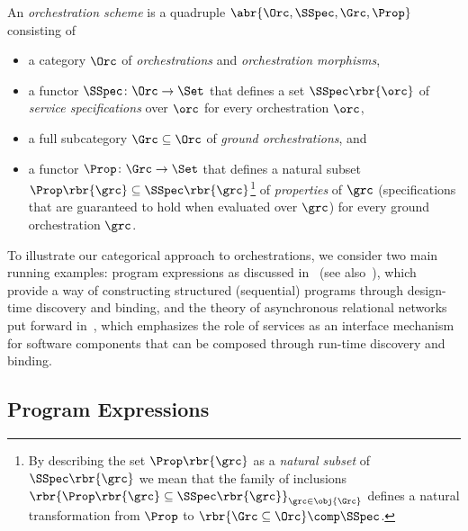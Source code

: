 \documentclass{LMCS}
\begin{document}
\begin{defi}
  An \emph{orchestration scheme} is a quadruple \(\abr{\Orc, \SSpec,\linebreak[0] \Grc, \Prop}\) consisting of
  \begin{itemize}
    
  \item a category \(\Orc\) of \emph{orchestrations} and \emph{orchestration morphisms},

  \item a functor \(\SSpec \colon \Orc \to \Set\) that defines a set \(\SSpec\rbr{\orc}\) of \emph{service specifications} over \(\orc\) for every orchestration \(\orc\),

  \item a full subcategory \(\Grc \subseteq \Orc\) of \emph{ground orchestrations}, and

  \item a functor \(\Prop \colon \Grc \to \Set\) that defines a natural subset \(\Prop\rbr{\grc} \subseteq \SSpec\rbr{\grc}\)\footnote{By describing the set \(\Prop\rbr{\grc}\) as a \emph{natural subset} of \(\SSpec\rbr{\grc}\) we mean that the family of inclusions \(\rbr{\Prop\rbr{\grc} \subseteq \SSpec\rbr{\grc}}_{\grc \in \obj{\Grc}}\) defines a natural transformation from \(\Prop\) to \(\rbr{\Grc \subseteq \Orc} \comp \SSpec\).} of \emph{properties} of \(\grc\) (specifications that are guaranteed to hold when evaluated over \(\grc\)) for every ground orchestration \(\grc\).
    
  \end{itemize}
\end{defi}

\noindent To illustrate our categorical approach to orchestrations, we consider two main running examples: program expressions as discussed in~\cite{Fiadeiro:The-many-faces-of-complexity-in-software-design-2012} (see also~\cite{Morgan:Programming-from-Specifications-1994}), which provide a way of constructing structured (sequential) programs through design-time discovery and binding, and the theory of asynchronous relational networks put forward in~\cite{Fiadeiro-Lopes:An-interface-theory-for-service-oriented-design-2013}, which emphasizes the role of services as an interface mechanism for software components that can be composed through run-time discovery and binding.


\subsection{Program Expressions}
\label{subsection:program-expressions}
\end{document}
